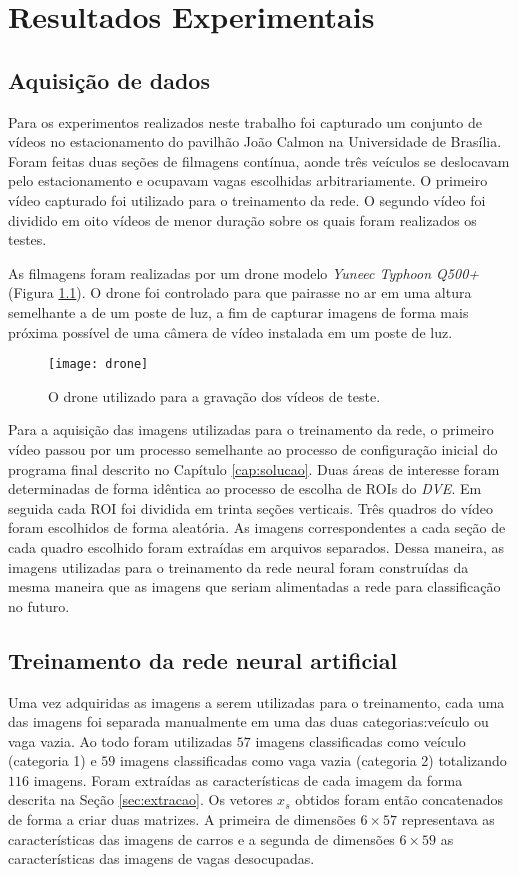 \chapter{Resultados Experimentais}\label{cap:results}

\section{Aquisição de dados}

Para os experimentos realizados neste trabalho foi capturado um conjunto de vídeos no estacionamento do pavilhão João Calmon na Universidade de Brasília. Foram feitas duas seções de filmagens contínua, aonde três veículos se deslocavam pelo estacionamento e ocupavam vagas escolhidas arbitrariamente. O primeiro vídeo capturado foi utilizado para o treinamento da rede. O segundo vídeo foi dividido em oito vídeos de menor duração sobre os quais foram realizados os testes.

As filmagens foram realizadas por um drone modelo \textit{Yuneec Typhoon Q500+} (Figura \ref{fig:drone}). O drone foi controlado para que pairasse no ar em uma altura semelhante a de um poste de luz, a fim de capturar imagens de forma mais próxima possível de uma câmera de vídeo instalada em um poste de luz.

\begin{figure}
\centering
\texttt{[image: drone]}
\caption{O drone utilizado para a gravação dos vídeos de teste.}
\label{fig:drone}
\centering
\end{figure}

Para a aquisição das imagens utilizadas para o treinamento da rede, o primeiro vídeo passou por um processo semelhante ao processo de configuração inicial do programa final descrito no Capítulo \ref{cap:solucao}. Duas áreas de interesse foram determinadas de forma idêntica ao processo de escolha de ROIs do \textit{DVE}. Em seguida cada ROI foi dividida em trinta seções verticais. Três quadros do vídeo foram escolhidos de forma aleatória. As imagens correspondentes a cada seção de cada quadro escolhido foram extraídas em arquivos separados. Dessa maneira, as imagens utilizadas para o treinamento da rede neural foram construídas da mesma maneira que as imagens que seriam alimentadas a rede para classificação no futuro.

\section{Treinamento da rede neural artificial}
Uma vez adquiridas as imagens a serem utilizadas para o treinamento, cada uma das imagens foi separada manualmente em uma das duas categorias:veículo ou vaga vazia. Ao todo foram utilizadas $57$ imagens classificadas como veículo (categoria 1) e $59$ imagens classificadas como vaga vazia (categoria 2) totalizando $116$ imagens. Foram extraídas as características de cada imagem da forma descrita na Seção \ref{sec:extracao}. Os vetores $x_s$ obtidos foram então concatenados de forma a criar duas matrizes. A primeira de dimensões $6\times 57$ representava as características das imagens de carros e a segunda de dimensões $6\times 59$ as características das imagens de vagas desocupadas.

